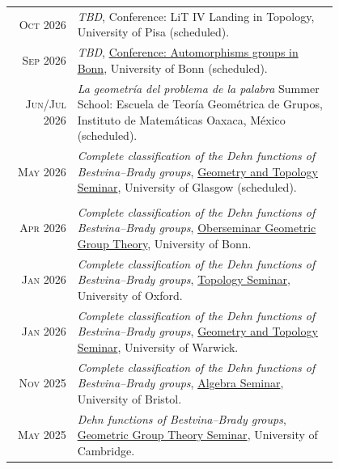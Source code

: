 \documentclass[a4paper,10pt]{article} %
\begin{document}
\begin{longtable}{rp{0.8\linewidth}}

	\textsc{Oct 2026} & \emph{TBD}, \textcolor{linkcolour}{Conference: LiT IV Landing in Topology}, University of Pisa (scheduled). \\ %
	
	\textsc{Sep 2026} & \emph{TBD}, \href{https://sites.google.com/view/autbonn/home}{Conference: Automorphisms groups in Bonn}, University of Bonn (scheduled). \\ %
	
	\textsc{Jun/Jul 2026} & \emph{La geometría del problema de la palabra} \textcolor{linkcolour}{Summer School: Escuela de Teoría Geométrica de Grupos}, Instituto de Matemáticas Oaxaca, México (scheduled). \\ %
	
	\textsc{May 2026} & \emph{Complete classification of the Dehn functions of Bestvina--Brady groups}, \href{https://www.gla.ac.uk/schools/mathematicsstatistics/events/?seriesID=8}{Geometry and Topology Seminar}, University of Glasgow (scheduled). \\
	
	\\
	
	
	\textsc{Apr 2026} & \emph{Complete classification of the Dehn functions of Bestvina--Brady groups}, \href{https://www.math.uni-bonn.de/people/gardam/ggt_seminar.html}{Oberseminar Geometric Group Theory}, University of Bonn. \\
		
	\textsc{Jan 2026} & \emph{Complete classification of the Dehn functions of Bestvina--Brady groups}, \href{https://www.maths.ox.ac.uk/node/79963}{Topology Seminar}, University of Oxford. \\
	
	\textsc{Jan 2026} & \emph{Complete classification of the Dehn functions of Bestvina--Brady groups}, \href{https://warwick.ac.uk/fac/sci/maths/research/events/seminars/areas/geomtop/}{Geometry and Topology Seminar}, University of Warwick. \\
	
	\textsc{Nov 2025} & \emph{Complete classification of the Dehn functions of Bestvina--Brady groups}, \href{https://www.bristolmathsresearch.org/seminar/jeronimo-garcia-mejia/}{Algebra Seminar}, University of Bristol. \\
	
	\textsc{May 2025} & \emph{Dehn functions of Bestvina--Brady groups}, \href{https://talks.cam.ac.uk/talk/index/229831}{Geometric Group Theory Seminar}, University of Cambridge. \\


\end{longtable}
\end{document}
